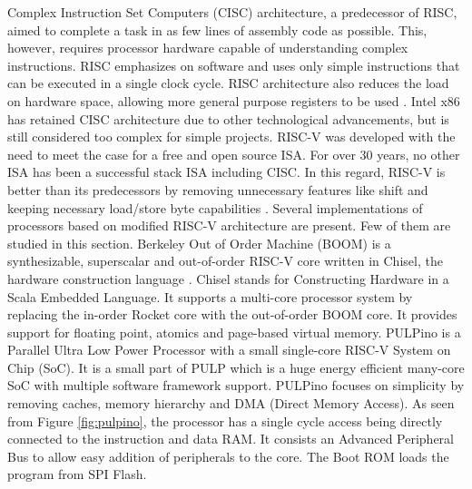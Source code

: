 Complex Instruction Set Computers (CISC) architecture, a predecessor of RISC, aimed to complete a task in as few lines of assembly code as possible. This, however, requires processor hardware capable of understanding complex instructions. RISC emphasizes on software and uses only simple instructions that can be executed in a single clock cycle. RISC architecture also reduces the load on hardware space, allowing more general purpose registers to be used
\cite{risc_vs_cisc}. Intel x86 has retained CISC architecture due to other technological advancements, but is still considered too complex for simple projects.\newline \newline
RISC-V was developed with the need to meet the case for a free and open source ISA. For over 30 years, no other ISA has been a successful stack ISA including CISC. In this regard, RISC-V is better than its predecessors by removing unnecessary features like shift and keeping necessary load/store byte capabilities
\cite{riscv_isa_free}.\newline \newline
Several implementations of processors based on modified RISC-V architecture are present. Few of them are studied in this section. Berkeley Out of Order Machine (BOOM) is a synthesizable, superscalar and out-of-order RISC-V core written in Chisel, the hardware construction language
\cite{boom_2015}. Chisel stands for Constructing Hardware in a Scala Embedded Language. It supports a multi-core processor system by replacing the in-order Rocket core with the out-of-order BOOM core. It provides support for floating point, atomics and page-based virtual memory.\newline \newline
PULPino is a Parallel Ultra Low Power Processor with a small single-core RISC-V System on Chip (SoC). It is a small part of PULP which is a huge energy efficient many-core SoC with multiple software framework support. PULPino focuses on simplicity by removing caches, memory hierarchy and DMA (Direct Memory Access). As seen from Figure \ref{fig:pulpino}, the processor has a single cycle access being directly connected to the instruction and data RAM. It consists an Advanced Peripheral Bus to allow easy addition of peripherals to the core. The Boot ROM loads the program from SPI Flash.\newline

